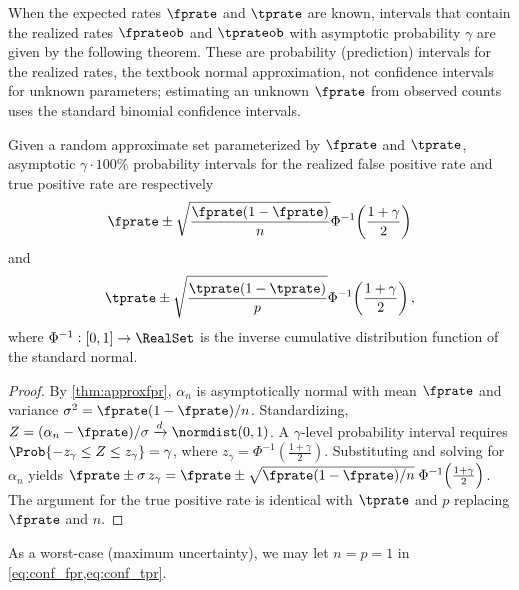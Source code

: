 When the expected rates $\fprate$ and $\tprate$ are known, intervals that contain the realized rates $\fprateob$ and $\tprateob$ with asymptotic probability $\gamma$ are given by the following theorem.
These are probability (prediction) intervals for the realized rates, the textbook normal approximation, not confidence intervals for unknown parameters; estimating an unknown $\fprate$ from observed counts uses the standard binomial confidence intervals.
\begin{theorem}
    Given a random approximate set parameterized by $\fprate$ and $\tprate$, asymptotic $\gamma \cdot 100\%$ probability intervals for the realized false positive rate and true positive rate are respectively
    \begin{equation}
    \label{eq:conf_fpr}
    \fprate \pm \sqrt{\frac{\fprate(1-\fprate)}{n}} \Phi^{-1}\!\left(\frac{1+\gamma}{2}\right)
    \end{equation}
    and
    \begin{equation}
    \label{eq:conf_tpr}
    \tprate \pm \sqrt{\frac{\tprate(1-\tprate)}{p}} \Phi^{-1}\!\left(\frac{1+\gamma}{2}\right),
    \end{equation}
    where $\Phi^{-1} : [0,1] \to \RealSet$ is the inverse cumulative distribution function of the standard normal.
\end{theorem}
\begin{proof}
By \cref{thm:approxfpr}, $\alpha_n$ is asymptotically normal with mean $\fprate$ and variance $\sigma^2 = \fprate(1-\fprate)/n$.
Standardizing, $Z = (\alpha_n - \fprate)/\sigma \xrightarrow{d} \normdist(0,1)$.
A $\gamma$-level probability interval requires
$\Prob{-z_\gamma \leq Z \leq z_\gamma} = \gamma$,
where $z_\gamma = \Phi^{-1}\!\left(\frac{1+\gamma}{2}\right)$.
Substituting and solving for $\alpha_n$ yields
$\fprate \pm \sigma \, z_\gamma = \fprate \pm \sqrt{\fprate(1-\fprate)/n}\;\Phi^{-1}\!\left(\frac{1+\gamma}{2}\right)$.
The argument for the true positive rate is identical with $\tprate$ and $p$ replacing $\fprate$ and $n$.
\end{proof}
As a worst-case (maximum uncertainty), we may let $n = p = 1$ in \cref{eq:conf_fpr,eq:conf_tpr}.
